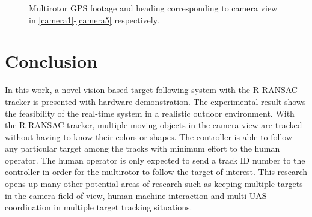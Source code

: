 \begin{figure}[htbp]
	\centering
	\caption{Multirotor GPS footage and heading corresponding to camera view in \ref{camera1}-\ref{camera5} respectively.}
	\label{gps}
\end{figure}

\section{Conclusion}
In this work, a novel vision-based target following system with the R-RANSAC tracker is presented with hardware demonstration. The experimental result shows the feasibility of the real-time system in a realistic outdoor environment. With the R-RANSAC tracker, multiple moving objects in the camera view are tracked without having to know their colors or shapes. The controller is able to follow any particular target among the tracks with minimum effort to the human operator. The human operator is only expected to send a track ID number to the controller in order for the multirotor to follow the target of interest. This research opens up many other potential areas of research such as keeping multiple targets in the camera field of view, human machine interaction and multi UAS coordination in multiple target tracking situations.